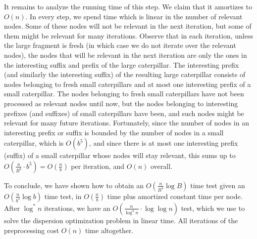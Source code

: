 \documentclass[11pt,a4paper]{article}
\theoremstyle{definition}
\theoremstyle{remark}
\begin{document}
It remains to analyze the running time of  this step. We claim that it
amortizes to $O(n)$. 
In every step, we spend time which is linear in the number of relevant nodes. Some of these nodes will not be relevant in the next iteration, but some of them might be relevant for many iterations. Observe that in each iteration, unless the large fragment is fresh (in which case we do not iterate over the relevant nodes), the nodes that will be relevant in the next iteration are only the ones in the interesting suffix and prefix of the large caterpillar. The interesting prefix (and similarly the interesting suffix) of the resulting large caterpillar
consists of nodes belonging to fresh small caterpillars and at most one interesting prefix of
a small caterpillar. The nodes belonging to fresh small caterpillars have not been processed as relevant nodes until now, but the nodes belonging to interesting prefixes (and suffixes) of small caterpillars have been, and such nodes might be relevant for many future iterations. Fortunately, since the number of nodes in an interesting prefix or suffix is bounded by the number of nodes in a small caterpillar, which is $O(b^{5})$, and since there is at most one interesting prefix (suffix) of a small caterpillar whose nodes will stay relevant, this sums up to $O(\frac{n}{B^{4}}\cdot b^{5}) = O(\frac{n}{b})$ per iteration, and $O(n)$ overall.

To conclude, we have shown how to obtain an $O(\frac{n}{B^{4}}\log B)$ time test given an $O(\frac{n}{b^{4}}\log b)$
time test, in $O(\frac{n}{b})$ time plus amortized constant time per
node. After $\log ^*n$ iterations, we have an  $O(\frac{n}{\log ^4n} \cdot \log \log n)$ test,
which we use to solve the dispersion optimization problem in linear time. All iterations of the preprocessing
cost $O(n)$ time altogether.
\end{document}

